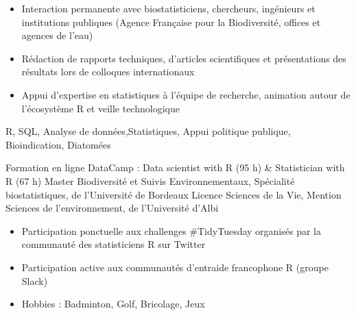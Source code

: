 \documentclass[localFont,alternative]{yaac-another-awesome-cv}
\begin{document}
\begin{experiences}
{\begin{itemize}
                        \item Interaction permanente avec biostatisticiens, chercheurs, ingénieurs et institutions publiques (Agence Française pour la Biodiversité, offices et agences de l'eau)
                        \item Rédaction de rapports techniques, d'articles scientifiques et présentations des résultats lors de colloques internationaux
                        \item Appui d'expertise en statistiques à l'équipe de recherche, animation autour de l'écosystème R et veille technologique                                                                         
                      \end{itemize}
                    }
                    {R, SQL, Analyse de données,Statistiques, Appui politique publique, Bioindication, Diatomées}
   
\end{experiences}


\begin{scholarship}

					{Formation en ligne DataCamp : Data scientist with R (95 h) \& Statistician with R (67 h)}
					{Master Biodiversité et Suivis Environnementaux, Spécialité biostatistiques, de l'Université de Bordeaux}
					{Licence Sciences de la Vie, Mention Sciences de l'environnement, de l'Université d'Albi}
\end{scholarship}


\begin{itemize}
\vspace{+1em}
\item Participation ponctuelle aux challenges \#TidyTuesday organisés par la communauté des statisticiens R sur Twitter\\
\item Participation active aux communautés d'entraide francophone R (groupe Slack) \\
\item Hobbies : Badminton, Golf, Bricolage, Jeux

\end{itemize}
\end{document}
